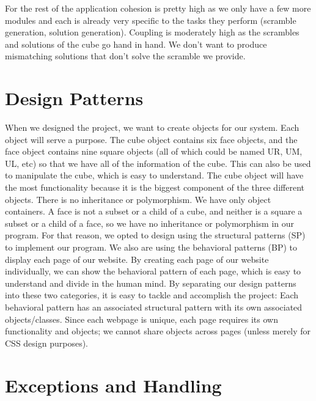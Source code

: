 \documentclass[12pt]{article}
\begin{document}
\par
For the rest of the application cohesion is pretty high as we only have a few more modules and each is already very specific to the tasks they perform (scramble generation, solution generation). Coupling is moderately high as the scrambles and solutions of the cube go hand in hand. We don’t want to produce mismatching solutions that don’t solve the scramble we provide. \\

\section{Design Patterns}
\par
When we designed the project, we want to create objects for our system. Each object will serve a purpose. The cube object contains six face objects, and the face object contains nine square objects (all of which could be named UR, UM, UL, etc) so that we have all of the information of the cube. This can also be used to manipulate the cube, which is easy to understand. The cube object will have the most functionality because it is the biggest component of the three different objects. There is no inheritance or polymorphism. We have only object containers. A face is not a subset or a child of a cube, and neither is a square a subset or a child of a face, so we have no inheritance or polymorphism in our program. For that reason, we opted to design using the structural patterns (SP) to implement our program. We also are using the behavioral patterns (BP) to display each page of our website. By creating each page of our website individually, we can show the behavioral pattern of each page, which is easy to understand and divide in the human mind. By separating our design patterns into these two categories, it is easy to tackle and accomplish the project: Each behavioral pattern has an associated structural pattern with its own associated objects/classes. Since each webpage is unique, each page requires its own functionality and objects; we cannot share objects across pages (unless merely for CSS design purposes). \\

\section{Exceptions and Handling}
\end{document}
